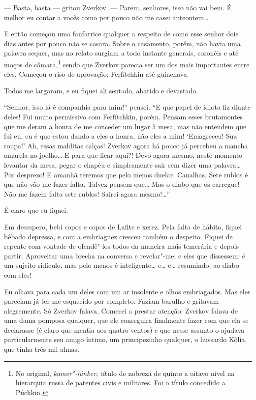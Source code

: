 --- Basta, basta --- gritou Zverkov. --- Parem, senhores, isso não vai bem. É
melhor eu contar a vocês como por pouco não me casei anteontem\ldots{}

E então começou uma fanfarrice qualquer a respeito de como esse senhor
dois dias antes por pouco não se casara. Sobre o casamento, porém, não
havia uma palavra sequer, mas no relato surgiam a todo instante
generais, coronéis e até moços de câmara,\footnote{ No original,
\textit{kamer"-iúnker}, título de nobreza de quinto a oitavo nível na
hierarquia russa de patentes civis e militares. Foi o título concedido a
Púchkin.} sendo que Zverkov parecia ser um dos mais importantes entre
eles. Começou o riso de aprovação; Ferfítchkin até guinchava.

Todos me largaram, e eu fiquei ali sentado, abatido e devastado.

“Senhor, isso lá é companhia para mim!” pensei. “E que papel de idiota
fiz diante deles! Fui muito permissivo com Ferfítchkin, porém. Pensam
esses brutamontes que me deram a honra de me conceder um lugar à mesa,
mas não entendem que fui eu, eu é que estou dando a eles a honra, não
eles a mim! ‘Emagreceu! Sua roupa!’ Ah, essas malditas calças! Zverkov
agora há pouco já percebeu a mancha amarela no joelho\ldots{} E para que
ficar aqui?! Devo agora mesmo, neste momento levantar da mesa, pegar o
chapéu e simplesmente sair sem dizer uma palavra\ldots{} Por desprezo! E
amanhã teremos que pelo menos duelar. Canalhas. Sete rublos é que não
vão me fazer falta. Talvez pensem que\ldots{} Mas o diabo que os carregue!
Não me fazem falta sete rublos! Sairei agora mesmo!\ldots{}”

É claro que eu fiquei.

Em desespero, bebi copos e copos de Lafite e xerez. Pela falta de
hábito, fiquei bêbado depressa, e com a embriaguez cresceu também o
despeito. Fiquei de repente com vontade de ofendê"-los todos da maneira
mais temerária e depois partir. Aproveitar uma brecha na conversa e
revelar"-me; e eles que dissessem: é um sujeito ridículo, mas pelo menos
é inteligente\ldots{} e\ldots{} e\ldots{} resumindo, ao diabo com eles!

Eu olhava para cada um deles com um ar insolente e olhos embriagados.
Mas eles pareciam já ter me esquecido por completo. Faziam barulho e
gritavam alegremente. Só Zverkov falava. Comecei a prestar atenção.
Zverkov falava de uma dama pomposa qualquer, que ele conseguira
finalmente fazer com que ela se declarasse (é claro que mentia aos
quatro ventos) e que nesse assunto o ajudava particularmente seu amigo
íntimo, um principezinho qualquer, o hussardo Kôlia, que tinha três mil
almas.

